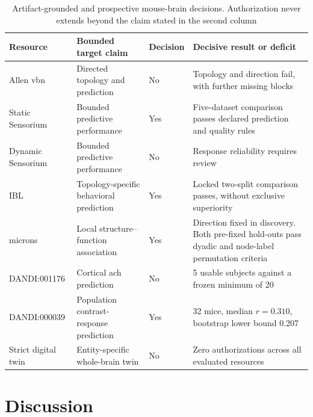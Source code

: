 \documentclass[11pt,a4paper]{article}
\begin{document}
\begin{table}[H]
\centering
\caption{Artifact-grounded and prospective mouse-brain decisions. Authorization never extends beyond the claim stated in the second column}
\label{tab:prospective-applications}
\footnotesize
\renewcommand{\arraystretch}{1.08}
\begin{tabularx}{\textwidth}{@{}P{0.17\textwidth}P{0.23\textwidth}P{0.10\textwidth}Y@{}}
\toprule
Resource & Bounded target claim & Decision & Decisive result or deficit \\
\midrule
Allen \ac{vbn} & Directed topology and prediction & No & Topology and direction fail, with further missing blocks \\
Static Sensorium & Bounded predictive performance & Yes & Five-dataset comparison passes declared prediction and quality rules \\
Dynamic Sensorium & Bounded predictive performance & No & Response reliability requires review \\
IBL & Topology-specific behavioral prediction & Yes & Locked two-split comparison passes, without exclusive superiority \\
\ac{microns} & Local structure--function association & Yes & Direction fixed in discovery. Both pre-fixed hold-outs pass dyadic and node-label permutation criteria \\
DANDI:001176 & Cortical \ac{ach} prediction & No & 5 usable subjects against a frozen minimum of 20 \\
DANDI:000039 & Population contrast-response prediction & Yes & 32 mice, median $r=0.310$, bootstrap lower bound 0.207 \\
Strict digital twin & Entity-specific whole-brain twin & No & Zero authorizations across all evaluated resources \\
\bottomrule
\end{tabularx}
\end{table}






\section{Discussion}
\label{sec:discussion}
\end{document}
